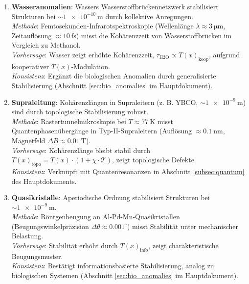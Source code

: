 \documentclass[12pt,a4paper]{article}
\newcommand{\Tfield}{T(x)}
\begin{document}
	\begin{enumerate}
		\item \textbf{Wasseranomalien}: Wassers Wasserstoffbrückennetzwerk stabilisiert Strukturen bei $\sim \SI{1e-10}{\meter}$ durch kollektive Anregungen. \\
		\textit{Methode}: Femtosekunden-Infrarotspektroskopie (Wellenlänge $\lambda \approx \SI{3}{\micro\meter}$, Zeitauflösung $\approx \SI{10}{\femto\second}$) misst die Kohärenzzeit von Wasserstoffbrücken im Vergleich zu Methanol. \\
		\textit{Vorhersage}: Wasser zeigt erhöhte Kohärenzzeit, $\tau_{\text{H2O}} \propto \Tfield_{\text{koop}}$, aufgrund kooperativer $\Tfield$-Modulation. \\
		\textit{Konsistenz}: Ergänzt die biologischen Anomalien durch generalisierte Stabilisierung (Abschnitt \ref{sec:bio_anomalies} im Hauptdokument).
		
		\item \textbf{Supraleitung}: Kohärenzlängen in Supraleitern (z. B. YBCO, $\sim \SI{1e-9}{\meter}$) sind durch topologische Stabilisierung robust. \\
		\textit{Methode}: Rastertunnelmikroskopie bei $T \approx \SI{77}{\kelvin}$ misst Quantenphasenübergänge in Typ-II-Supraleitern (Auflösung $\approx \SI{0.1}{\nano\meter}$, Magnetfeld $\Delta B \approx \SI{0.01}{\tesla}$). \\
		\textit{Vorhersage}: Kohärenzlänge bleibt stabil durch $\Tfield_{\text{topo}} = \Tfield \cdot (1 + \chi \cdot \mathcal{T})$, zeigt topologische Defekte. \\
		\textit{Konsistenz}: Verknüpft mit Quantenresonanzen in Abschnitt \ref{subsec:quantum} des Hauptdokuments.
		
		\item \textbf{Quasikristalle}: Aperiodische Ordnung stabilisiert Strukturen bei $\sim \SI{1e-9}{\meter}$. \\
		\textit{Methode}: Röntgenbeugung an Al-Pd-Mn-Quasikristallen (Beugungswinkelpräzision $\Delta\theta \approx 0.001^\circ$) misst Stabilität unter mechanischer Belastung. \\
		\textit{Vorhersage}: Stabilität erhöht durch $\Tfield_{\text{info}}$, zeigt charakteristische Beugungsmuster. \\
		\textit{Konsistenz}: Bestätigt informationsbasierte Stabilisierung, analog zu biologischen Systemen (Abschnitt \ref{sec:bio_anomalies} im Hauptdokument).
	\end{enumerate}
	
\end{document}
